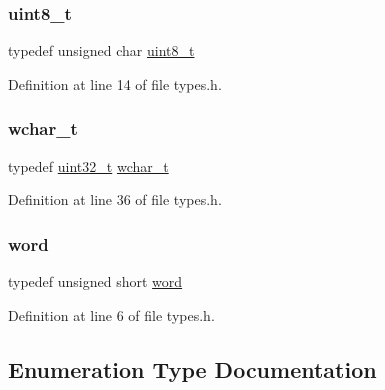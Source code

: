 \subsubsection{\texorpdfstring{uint8\+\_\+t}{uint8\_t}}
{\footnotesize\ttfamily typedef unsigned char \hyperlink{a00038_aba7bc1797add20fe3efdf37ced1182c5_aba7bc1797add20fe3efdf37ced1182c5}{uint8\+\_\+t}}



Definition at line 14 of file types.\+h.

\mbox{\label{a00038_a15db26eb22a71ba9df074b5c8f868d63_a15db26eb22a71ba9df074b5c8f868d63}} 
\subsubsection{\texorpdfstring{wchar\+\_\+t}{wchar\_t}}
{\footnotesize\ttfamily typedef \hyperlink{a00038_a435d1572bf3f880d55459d9805097f62_a435d1572bf3f880d55459d9805097f62}{uint32\+\_\+t} \hyperlink{a00038_a15db26eb22a71ba9df074b5c8f868d63_a15db26eb22a71ba9df074b5c8f868d63}{wchar\+\_\+t}}



Definition at line 36 of file types.\+h.

\mbox{\label{a00038_a285e72252c100e2508e4e933a0738f2b_a285e72252c100e2508e4e933a0738f2b}} 
\subsubsection{\texorpdfstring{word}{word}}
{\footnotesize\ttfamily typedef unsigned short \hyperlink{a00038_a285e72252c100e2508e4e933a0738f2b_a285e72252c100e2508e4e933a0738f2b}{word}}



Definition at line 6 of file types.\+h.



\subsection{Enumeration Type Documentation}
\mbox{\label{a00038_af6a258d8f3ee5206d682d799316314b1_af6a258d8f3ee5206d682d799316314b1}} 
